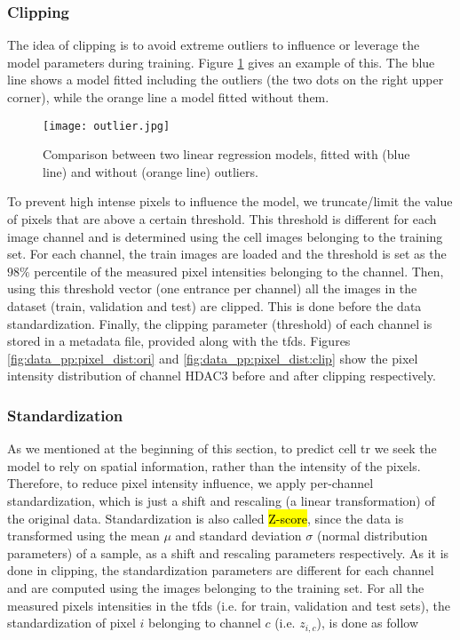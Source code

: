 \subsubsection{Clipping}

The idea of clipping is to avoid extreme outliers to influence or leverage the model parameters during training. Figure \ref{fig:data_pp:outlier} gives an example of this. The blue line shows a model fitted including the outliers (the two dots on the right upper corner), while the orange line a model fitted without them.

\begin{figure}[htb]
  \centering
  \texttt{[image: outlier.jpg]}
  \caption{Comparison between two linear regression models, fitted with (blue line) and without (orange line) outliers.}
  \label{fig:data_pp:outlier}
\end{figure}

To prevent high intense pixels to influence the model, we truncate/limit the value of pixels that are above a certain threshold. This threshold is different for each image channel and is determined using the cell images belonging to the training set. For each channel, the train images are loaded and the threshold is set as the $98\%$ percentile of the measured pixel intensities belonging to the channel. Then, using this threshold vector (one entrance per channel) all the images in the dataset (train, validation and test) are clipped. This is done before the data standardization. Finally, the clipping parameter (threshold) of each channel is stored in a metadata file, provided along with the \gls{tfds}. Figures \ref{fig:data_pp:pixel_dist:ori} and \ref{fig:data_pp:pixel_dist:clip} show the pixel intensity distribution of channel HDAC3 before and after clipping respectively.

\subsubsection{Standardization}

As we mentioned at the beginning of this section, to predict cell \gls{tr} we seek the model to rely on spatial information, rather than the intensity of the pixels. Therefore, to reduce pixel intensity influence, we apply per-channel standardization, which is just a shift and rescaling (a linear transformation) of the original data. Standardization is also called \hl{Z-score}, since the data is transformed using the mean $\mu$ and standard deviation $\sigma$ (normal distribution parameters) of a sample, as a shift and rescaling parameters respectively. As it is done in clipping, the standardization parameters are different for each channel and are computed using the images belonging to the training set. For all the measured pixels intensities in the \gls{tfds} (i.e. for train, validation and test sets), the standardization of pixel $i$ belonging to channel $c$ (i.e. $z_{i,c}$), is done as follow

